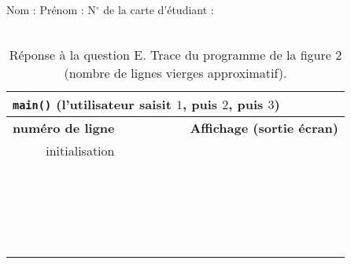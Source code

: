 \documentclass[landscape, 12pt]{article}
\newcommand{\C}[1]{{\upshape\texttt{#1}}}
\begin{document}
\thispagestyle{empty}

  \begin{table}[h]
      \begin{center}
\renewcommand{\arraystretch}{1.4}
  Nom : \hfill Prénom : \hfill N$^{\circ}$ de la carte d'étudiant : \hfill \phantom{.}\\ \hrulefill \\
       \begin{tabular}[t]{|r|c|c|c|c|c|l|}
          \multicolumn{7}{l}{\C{main()} (l'utilisateur saisit $1$, puis $2$, puis $3$)}\\ \hline
          \textbf{numéro de ligne} & \hspace{3em} & \hspace{3em} & \hspace{3em} & \hspace{3em} & \hspace{3em} &  \textbf{Affichage (sortie écran)}  \hspace{15em} \\ \hline
          initialisation  & & & & & & \\ \hline
           & & & & & & \\ \hline
           & & & & & & \\ \hline
           & & & & & & \\ \hline
           & & & & & & \\ \hline
           & & & & & & \\ \hline
           & & & & & & \\ \hline
           & & & & & & \\ \hline
           & & & & & & \\ \hline
           & & & & & & \\ \hline
           & & & & & & \\ \hline
           & & & & & & \\ \hline
           & & & & & & \\ \hline
           & & & & & & \\ \hline
           & & & & & & \\ \hline
           & & & & & & \\ \hline
           & & & & & & \\ \hline
           & & & & & & \\ \hline
           & & & & & & \\ \hline
           & & & & & & \\ \hline
           & & & & & & \\ \hline
       \end{tabular}
\end{center}
        \caption{Réponse à la question E. Trace du programme de la figure 2 (nombre de lignes vierges approximatif).}
        \label{simulation}
\end{table}
\end{document}
